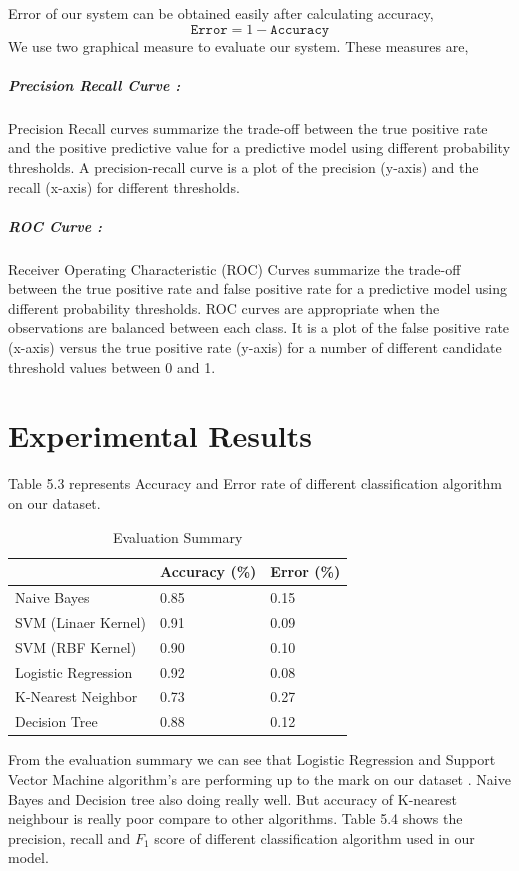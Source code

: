 \documentclass[12pt,a4paper]{report}
\begin{document}
Error of our system can be obtained easily after calculating accuracy,
\begin{equation}
    \texttt{Error} = 1-\texttt{Accuracy}
\end{equation}
We use two graphical measure to evaluate our system. These measures are,
\subparagraph{Precision Recall Curve :}
Precision Recall curves summarize the trade-off between the true positive rate and the positive predictive value for a predictive model using different probability thresholds. A precision-recall curve is a plot of the precision (y-axis) and the recall (x-axis) for different thresholds.

\subparagraph{ROC Curve :}
Receiver Operating Characteristic (ROC) Curves summarize the trade-off between the true positive rate and false positive rate for a predictive model using different probability thresholds. ROC curves are appropriate when the observations are balanced between each class. It is a plot of the false positive rate (x-axis) versus the true positive rate (y-axis) for a number of different candidate threshold values between 0 and 1.

\section{Experimental Results}
Table 5.3 represents Accuracy and Error rate of different classification algorithm on our dataset.
\renewcommand{\arraystretch}{1.5}
\begin{table}[h!]
\begin{center}
\caption{Evaluation Summary}
\begin{tabular}{|m{7cm} | m{3cm}| m{3cm}|}
\hline
     & Accuracy (\%) & Error (\%) \\
\hline
    Naive Bayes & 0.85 & 0.15\\
\hline 
    SVM (Linaer Kernel) & 0.91 & 0.09\\
\hline 
    SVM (RBF Kernel) & 0.90 & 0.10\\
\hline 
    Logistic Regression & 0.92 & 0.08\\
\hline
    K-Nearest Neighbor & 0.73 & 0.27\\
\hline
    Decision Tree & 0.88 & 0.12\\
\hline
\end{tabular}
\end{center}
\end{table}
\par
\noindent
From the evaluation summary we can see that Logistic Regression and Support Vector Machine algorithm's are performing up to the mark on our dataset . Naive Bayes and Decision tree also doing really well. But accuracy of K-nearest neighbour is really poor compare to other algorithms. 
\clearpage
\noindent
Table 5.4 shows the precision, recall and $F_1$ score of different classification algorithm used in our model.
\end{document}
